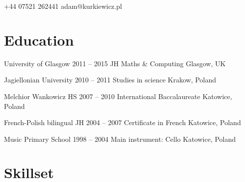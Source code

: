 \documentclass{tccv}
\begin{document}
\begin{eventlist}
\end{eventlist}

    {+44 07521 262441}
    {adam@kurkiewicz.pl} 

\section{Education}

\begin{yearlist}

\item[University of Glasgow]
     {2011 -- 2015}
     {JH Maths \& Computing}
     {Glasgow, UK}

\item[Jagiellonian University]
     {2010 -- 2011}
     {Studies in science}
     {Krakow, Poland}

\item[Melchior Wankowicz HS]
     {2007 -- 2010}
     {International Baccalaureate}
     {Katowice, Poland}

\item[French-Polish bilingual JH]
     {2004 -- 2007}
     {Certificate in French}
     {Katowice, Poland}
\item[Music Primary School]
     {1998 -- 2004}
     {Main instrument: Cello}
     {Katowice, Poland}

\end{yearlist}

\section{Skillset}
\end{document}
